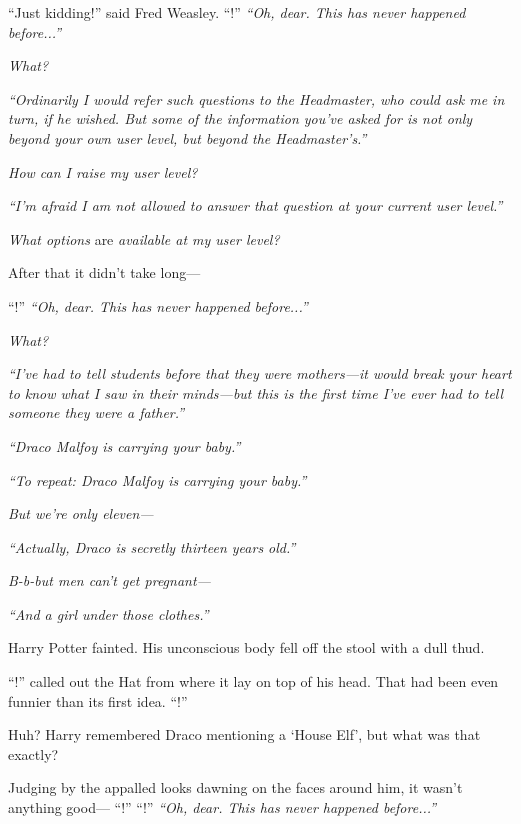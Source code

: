 “Just kidding!” said Fred Weasley. “!”
\sbreak
\emph{“Oh, dear. This has never happened before...”}

\emph{What?}

\emph{“Ordinarily I would refer such questions to the Headmaster, who could ask me in turn, if he wished. But some of the information you’ve asked for is not only beyond your own user level, but beyond the Headmaster’s.”}

\emph{How can I raise my user level?}

\emph{“I’m afraid I am not allowed to answer that question at your current user level.”}

\emph{What options} are \emph{available at my user level?}

After that it didn’t take long—

“!”
\sbreak
\emph{“Oh, dear. This has never happened before...”}

\emph{What?}

\emph{“I’ve had to tell students before that they were mothers—it would break your heart to know what I saw in their minds—but this is the first time I’ve ever had to tell someone they were a father.”}


\emph{“Draco Malfoy is carrying your baby.”}


\emph{“To repeat: Draco Malfoy is carrying your baby.”}

\emph{But we’re only eleven—}

\emph{“Actually, Draco is secretly thirteen years old.”}

\emph{B-b-but men can’t get pregnant—}

\emph{“And a girl under those clothes.”}



Harry Potter fainted. His unconscious body fell off the stool with a dull thud.

“!” called out the Hat from where it lay on top of his head. That had been even funnier than its first idea.
\sbreak
“!”

Huh? Harry remembered Draco mentioning a ‘House Elf’, but what was that exactly?

Judging by the appalled looks dawning on the faces around him, it wasn’t anything good—
\sbreak
“!”
\sbreak
“!”
\sbreak
\emph{“Oh, dear. This has never happened before...”}

